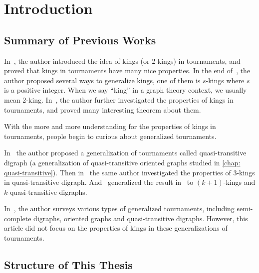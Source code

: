 \chapter{Introduction}

\section{Summary of Previous Works}

In~\cite{maurer_king_1980}, the author introduced
the idea of kings (or 2-kings) in tournaments,
and proved that kings in tournaments have many nice properties.
In the end of~\cite{maurer_king_1980},
the author proposed several ways to generalize kings,
one of them is \(s\)-kings where \(s\) is a positive integer.
When we say ``king'' in a graph theory context,
we usually mean 2-king.
In~\cite{reid_every_1982}, the author
further investigated the properties of kings in tournaments,
and proved many interesting theorem about them.

With the more and more understanding for the properties
of kings in tournaments,
people begin to curious about generalized tournaments.

In~\cite{bangjensen_quasitransitive_1995} the author
proposed a generalization of tournaments called
quasi-transitive digraph (a generalization of
quasi-transitive oriented graphs studied in \cref{chap: quasi-transitive}).
Then in~\cite{bang-jensen_kings_1998}
the same author investigated the properties
of 3-kings in quasi-transitive digraph.
And~\cite{galeana-sanchez_existence_2013}
generalized the result in~\cite{bang-jensen_kings_1998}
to \((k+1)\)-kings and \(k\)-quasi-transitive digraphs.

In~\cite{bang-jensen_generalizations_1998},
the author surveys various types of generalized tournaments,
including semi-complete digraphs, oriented graphs and
quasi-transitive digraphs.
However, this article did not focus on the properties
of kings in these generalizations of tournaments.


\section{Structure of This Thesis}


